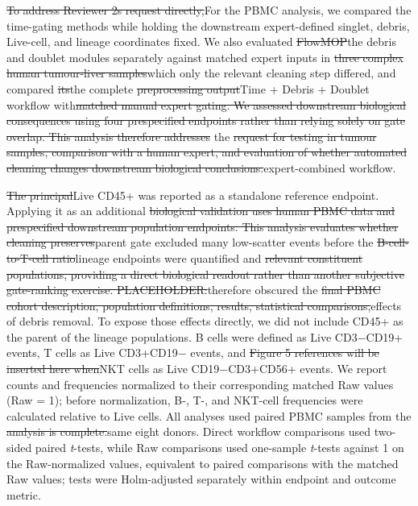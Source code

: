 \documentclass[
  11pt,
  a4paper,
]{article}
\begin{document}
{\color{revisionred}\sout{To address Reviewer 2\textquotesingle s
request directly,}}{\color{revisionblue}For the PBMC analysis,} we
{\color{revisionblue}compared the time-gating methods while holding the
downstream expert-defined singlet, debris, Live-cell, and lineage
coordinates fixed. We also} evaluated
{\color{revisionred}\sout{FlowMOP}}{\color{revisionblue}the debris and
doublet modules separately against matched expert inputs} in
{\color{revisionred}\sout{three complex human tumour-liver
samples}}{\color{revisionblue}which only the relevant cleaning step
differed,} and compared
{\color{revisionred}\sout{its}}{\color{revisionblue}the} complete
{\color{revisionred}\sout{preprocessing
output}}{\color{revisionblue}Time + Debris + Doublet workflow}
with{\color{revisionred}\sout{matched manual expert gating. We assessed
downstream biological consequences using four prespecified endpoints
rather than relying solely on gate overlap. This analysis therefore
addresses}} the {\color{revisionred}\sout{request for testing in tumour
samples, comparison with a human expert, and evaluation of whether
automated cleaning changes downstream biological
conclusions.}}{\color{revisionblue}expert-combined workflow.}

{\color{revisionred}\sout{The principal}}{\color{revisionblue}Live CD45+
was reported as a standalone reference endpoint. Applying it as an}
additional {\color{revisionred}\sout{biological validation uses human
PBMC data and prespecified downstream population endpoints. This
analysis evaluates whether cleaning
preserves}}{\color{revisionblue}parent gate excluded many low-scatter
events before} the {\color{revisionred}\sout{B-cell-to-T-cell
ratio}}{\color{revisionblue}lineage endpoints were quantified} and
{\color{revisionred}\sout{relevant constituent populations, providing a
direct biological readout rather than another subjective gate-ranking
exercise. PLACEHOLDER:}}{\color{revisionblue}therefore obscured} the
{\color{revisionred}\sout{final PBMC cohort description, population
definitions, results, statistical
comparisons,}}{\color{revisionblue}effects of debris removal. To expose
those effects directly, we did not include CD45+ as the parent of the
lineage populations. B cells were defined as Live CD3−CD19+ events, T
cells as Live CD3+CD19− events,} and {\color{revisionred}\sout{Figure 5
references will be inserted here when}}{\color{revisionblue}NKT cells as
Live CD19−CD3+CD56+ events. We report counts and frequencies normalized
to their corresponding matched Raw values (Raw = 1); before
normalization, B-, T-, and NKT-cell frequencies were calculated relative
to Live cells. All analyses used paired PBMC samples from} the
{\color{revisionred}\sout{analysis is
complete.}}{\color{revisionblue}same eight donors. Direct workflow
comparisons used two-sided paired \emph{t}-tests, while Raw comparisons
used one-sample \emph{t}-tests against 1 on the Raw-normalized values,
equivalent to paired comparisons with the matched Raw values; tests were
Holm-adjusted separately within endpoint and outcome metric.}
\end{document}
